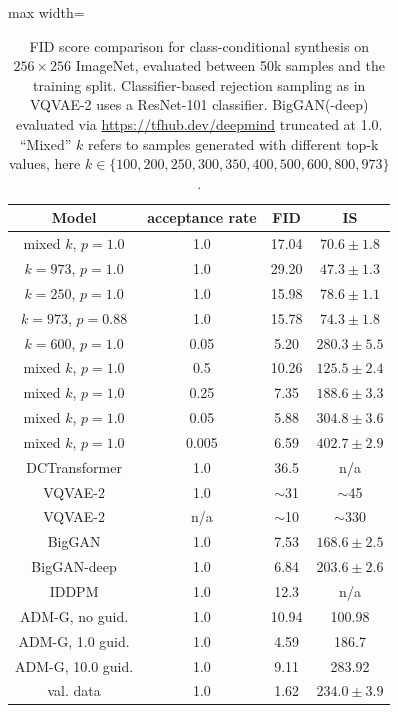 \begin{table}[t]
\begin{footnotesize}
  \begin{adjustbox}{max width=\linewidth}
\begin{tabular}{c ccc}
  Model & acceptance rate & FID & IS \\
\toprule
mixed $k$, $p=1.0$ & 1.0 & 17.04 & $70.6 \pm 1.8$ \\
$k=973$, $p=1.0$ & 1.0 & 29.20 & $47.3 \pm 1.3$ \\
$k=250$, $p=1.0$ & 1.0 & 15.98 & $78.6 \pm 1.1$ \\
$k=973$, $p=0.88$ & 1.0 & 15.78 & $74.3 \pm 1.8$ \\
$k=600$, $p=1.0$ & 0.05 & 5.20 & $280.3 \pm 5.5$\\ 
\midrule
mixed $k$, $p=1.0$ & 0.5 & 10.26 & $125.5 \pm 2.4$ \\
mixed $k$, $p=1.0$ & 0.25 & 7.35 & $188.6 \pm 3.3$ \\
mixed $k$, $p=1.0$ & 0.05 & 5.88 & $304.8 \pm 3.6$ \\
mixed $k$, $p=1.0$ & 0.005 & 6.59 & $402.7 \pm 2.9$ \\
\midrule
DCTransformer \cite{nash2021generating} & 1.0 & 36.5 & n/a \\
VQVAE-2 \cite{razavi2019generating} & 1.0 & $\sim$31 & $\sim$45 \\
VQVAE-2 & n/a & $\sim$10 & $\sim$330 \\
BigGAN \cite{brock2018large} & 1.0 & 7.53 & $168.6 \pm 2.5$ \\
BigGAN-deep & 1.0 & 6.84 & $203.6 \pm 2.6$ \\
IDDPM \cite{nichol2021improved} & 1.0 & 12.3 & n/a \\
ADM-G, no guid. \cite{dhariwal2021diffusion} & 1.0 & 10.94 & 100.98 \\
ADM-G, 1.0 guid. & 1.0 & 4.59 & 186.7 \\
ADM-G, 10.0 guid. & 1.0 & 9.11 & 283.92 \\
\midrule
val. data & 1.0 & 1.62 & $234.0 \pm 3.9$ \\
\bottomrule
\end{tabular}
  \end{adjustbox}
\end{footnotesize}
\caption{\label{tab:cinsynthesisupdate}
  FID score comparison for class-conditional
  synthesis on $256\times 256$ ImageNet, evaluated between 50k samples and the 
  training split. Classifier-based rejection sampling as in
  VQVAE-2 uses a ResNet-101 \cite{DBLP:journals/corr/HeZRS15} classifier. 
  BigGAN(-deep) evaluated via
  \url{https://tfhub.dev/deepmind} truncated at 1.0. ``Mixed'' $k$ refers to 
  samples generated with different top-k values, here $k \in \{100, 200, 250, 300, 350, 400, 500, 600, 800, 973\}$.
  }
\end{table}

